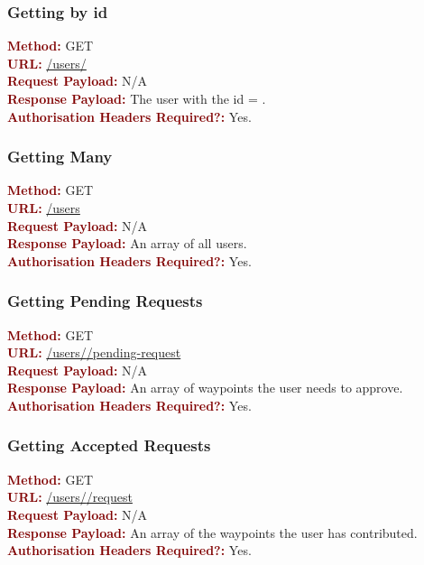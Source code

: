 \documentclass[11pt,a4paper]{report}
\begin{document}
\subsubsection{Getting by id}
\textbf{\textcolor{Maroon}{Method:}} GET\\
\textbf{\textcolor{Maroon}{URL:}} \url{/users/}\\
\textbf{\textcolor{Maroon}{Request Payload:}} N/A\\
\textbf{\textcolor{Maroon}{Response Payload:}} The user with the id = .\\
\textbf{\textcolor{Maroon}{Authorisation Headers Required?:}} Yes.

\subsubsection{Getting Many}
\textbf{\textcolor{Maroon}{Method:}} GET\\
\textbf{\textcolor{Maroon}{URL:}} \url{/users}\\
\textbf{\textcolor{Maroon}{Request Payload:}} N/A\\
\textbf{\textcolor{Maroon}{Response Payload:}} An array of all users.\\
\textbf{\textcolor{Maroon}{Authorisation Headers Required?:}} Yes.

\subsubsection{Getting Pending Requests}
\textbf{\textcolor{Maroon}{Method:}} GET\\
\textbf{\textcolor{Maroon}{URL:}} \url{/users/}\url{/pending-request}\\
\textbf{\textcolor{Maroon}{Request Payload:}} N/A\\
\textbf{\textcolor{Maroon}{Response Payload:}} An array of waypoints the user needs to approve.\\
\textbf{\textcolor{Maroon}{Authorisation Headers Required?:}} Yes.

\subsubsection{Getting Accepted Requests}
\textbf{\textcolor{Maroon}{Method:}} GET\\
\textbf{\textcolor{Maroon}{URL:}} \url{/users/}\url{/request}\\
\textbf{\textcolor{Maroon}{Request Payload:}} N/A\\
\textbf{\textcolor{Maroon}{Response Payload:}} An array of the waypoints the user has contributed.\\
\textbf{\textcolor{Maroon}{Authorisation Headers Required?:}} Yes.
\end{document}

